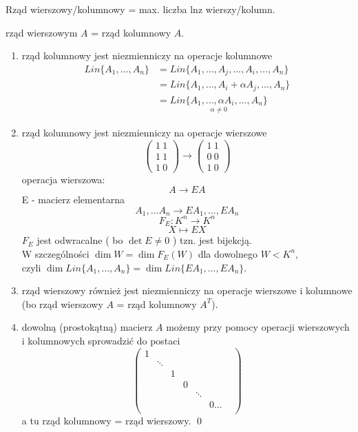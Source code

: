 \begin{uw}
    Rząd wierszowy/kolumnowy = max. liczba lnz wierszy/kolumn.
\end{uw}

\begin{tw} 
    rząd wierszowym $A$ = rząd kolumnowy $A$.
\end{tw}

\begin{dd} \hfill
    \begin{enumerate}[{(}1{)}]
        \item rząd kolumnowy jest niezmienniczy na operacje kolumnowe
        \begin{align*}
            Lin\{A_1,\dots,A_n\} & = Lin\{A_1,\dots,A_j,\dots,A_i,\dots,A_n\} \\
            & = Lin \{A_1, \dots,A_i + \alpha A_j, \dots, A_n\} \\
            & = \underset{\alpha \neq 0}{Lin \{A_1, \dots, \alpha A_i, \dots, A_n \}}
        \end{align*}
        \item rząd kolumnowy jest niezmienniczy na operacje wierszowe
        $$
        \begin{pmatrix}
            1 \ 1 \\ 
            1 \ 1 \\ 
            1 \ 0 
        \end{pmatrix}
            \rightarrow
        \begin{pmatrix}
            1 \ 1 \\ 
            0 \ 0 \\ 
            1 \ 0
        \end{pmatrix}
        $$
        operacja wierszowa: $$ A \rightarrow EA $$ E - macierz elementarna
        $$A_1, \dots A_n \rightarrow EA_1,\dots,EA_n$$ 
        $$ F_E : K^n \rightarrow K^n $$
        $$ X \mapsto EX $$
        $F_E$ jest odwracalne ( bo $\det E \neq 0$ ) tzn. jest bijekcją. \\
        W szczególności $\dim W = \dim F_E (W)$ dla dowolnego $ W < K^n$, \\ 
        czyli $\dim Lin \{A_1,\dots,A_n\} = \dim Lin \{EA_1,\dots,EA_n\}$.
        \item rząd wierszowy również jest niezmienniczy na operacje wierszowe i kolumnowe (bo rząd wierszowy $A$ = rząd kolumnowy $A^T$).
        \item dowolną (prostokątną) macierz $A$ możemy przy pomocy operacji wierszowych i kolumnowych sprowadzić do postaci $$
        \begin{pmatrix}
        1 & & & & & & \\ 
        & \ddots & & & & &  \\
        & & 1 & & & & \\
        & & & 0 & & & \\ 
        & & & & \ddots & & \\ 
        & & & & & 0 \dots \\
        \end{pmatrix} 
        $$
        a tu rząd kolumnowy = rząd wierszowy. \qed
    \end{enumerate}
\end{dd} 


